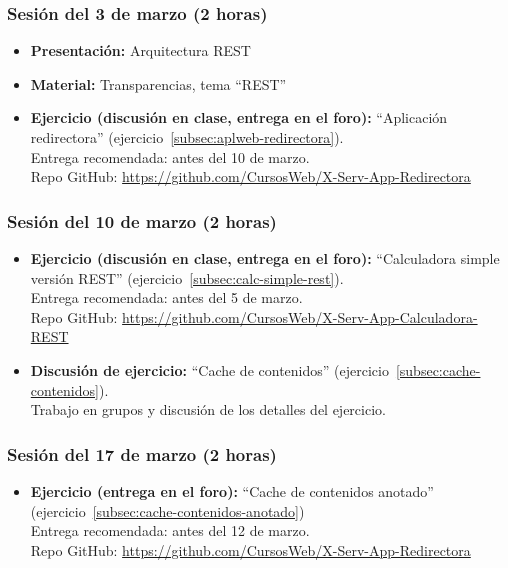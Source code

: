 \documentclass[a4paper,12pt]{article}
\begin{document}
\subsubsection{Sesión del 3 de marzo (2 horas)}

\begin{itemize}
\item \textbf{Presentación:} Arquitectura REST
\item \textbf{Material:} Transparencias, tema ``REST''
\item \textbf{Ejercicio (discusión en clase, entrega en el foro):} ``Aplicación redirectora'' (ejercicio~\ref{subsec:aplweb-redirectora}). \\
  Entrega recomendada: antes del 10 de marzo. \\
  Repo GitHub: \url{https://github.com/CursosWeb/X-Serv-App-Redirectora}
\end{itemize}


\subsubsection{Sesión del 10 de marzo (2 horas)}

\begin{itemize}
\item \textbf{Ejercicio (discusión en clase, entrega en el foro):} ``Calculadora simple versión REST'' (ejercicio~\ref{subsec:calc-simple-rest}). \\
  Entrega recomendada: antes del 5 de marzo. \\
  Repo GitHub: \url{https://github.com/CursosWeb/X-Serv-App-Calculadora-REST}
\item \textbf{Discusión de ejercicio:} ``Cache de contenidos'' (ejercicio~\ref{subsec:cache-contenidos}). \\
  Trabajo en grupos y discusión de los detalles del ejercicio.
\end{itemize}

\subsubsection{Sesión del 17 de marzo (2 horas)}

\begin{itemize}
\item \textbf{Ejercicio (entrega en el foro):} ``Cache de contenidos anotado'' (ejercicio~\ref{subsec:cache-contenidos-anotado}) \\
  Entrega recomendada: antes del 12 de marzo. \\
  Repo GitHub: \url{https://github.com/CursosWeb/X-Serv-App-Redirectora}
\end{itemize}
\end{document}

